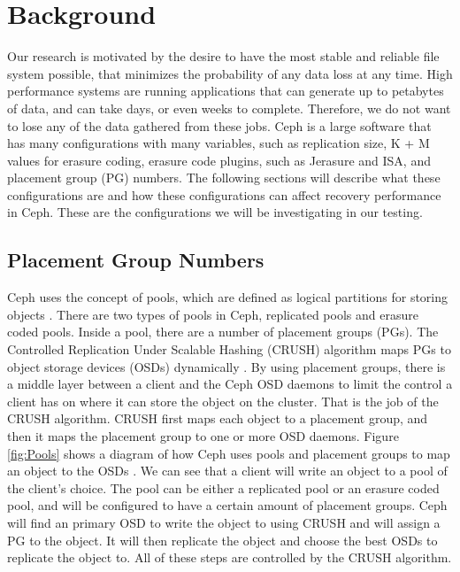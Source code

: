 \documentclass[conference,compsoc]{IEEEtran}
\begin{document}
\section{Background}
Our research is motivated by the desire to have the most stable and reliable file system possible, that minimizes the probability of any data loss at any time. High performance systems are running applications that can generate up to petabytes of data, and can take days, or even weeks to complete. Therefore, we do not want to lose any of the data gathered from these jobs. Ceph is a large software that has many configurations with many variables, such as replication size, K + M values for erasure coding, erasure code plugins, such as Jerasure and ISA, and placement group (PG) numbers. The following sections will describe what these configurations are and how these configurations can affect recovery performance in Ceph. These are the configurations we will be investigating in our testing.  

\subsection{Placement Group Numbers}
Ceph uses the concept of pools, which are defined as logical partitions for storing objects \cite{ceph_about_pools}. There are two types of pools in Ceph, replicated pools and erasure coded pools. Inside a pool, there are a number of placement groups (PGs). The Controlled Replication Under Scalable Hashing (CRUSH) algorithm maps PGs to object storage devices (OSDs) dynamically \cite{wang_evaluation}. By using placement groups, there is a middle layer between a client and the Ceph OSD daemons to limit the control a client has on where it can store the object on the cluster. That is the job of the CRUSH algorithm. CRUSH first maps each object to a placement group, and then it maps the placement group to one or more OSD daemons. Figure \ref{fig:Pools} shows a diagram of how Ceph uses pools and placement groups to map an object to the OSDs \cite{weil2006crush}. We can see that a client will write an object to a pool of the client's choice. The pool can be either a replicated pool or an erasure coded pool, and will be configured to have a certain amount of placement groups. Ceph will find an primary OSD to write the object to using CRUSH and will assign a PG to the object. It will then replicate the object and choose the best OSDs to replicate the object to. All of these steps are controlled by the CRUSH algorithm.  
\end{document}
